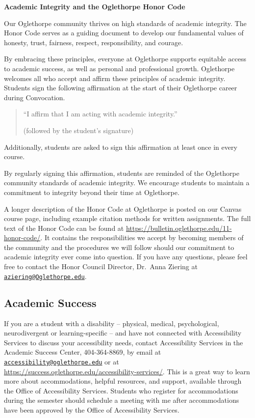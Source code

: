 \documentclass[
]{book}
\begin{document}
\textbf{Academic Integrity and the Oglethorpe Honor Code}

Our Oglethorpe community thrives on high standards of academic integrity. The Honor Code serves as a guiding document to develop our fundamental values of honesty, trust, fairness, respect, responsibility, and courage.

By embracing these principles, everyone at Oglethorpe supports equitable access to academic success, as well as personal and professional growth. Oglethorpe welcomes all who accept and affirm these principles of academic integrity.\\
Students sign the following affirmation at the start of their Oglethorpe career during Convocation.

\begin{quote}
``I affirm that I am acting with academic integrity.''

(followed by the student's signature)
\end{quote}

Additionally, students are asked to sign this affirmation at least once in every course.

By regularly signing this affirmation, students are reminded of the Oglethorpe community standards of academic integrity. We encourage students to maintain a commitment to integrity beyond their time at Oglethorpe.

A longer description of the Honor Code at Oglethorpe is posted on our Canvas course page, including example citation methods for written assignments. The full text of the Honor Code can be found at \url{https://bulletin.oglethorpe.edu/11-honor-code/}. It contains the responsibilities we accept by becoming members of the community and the procedures we will follow should our commitment to academic integrity ever come into question. If you have any questions, please feel free to contact the Honor Council Director, Dr.~Anna Ziering at \href{mailto:aziering@Oglethorpe.edu}{\nolinkurl{aziering@Oglethorpe.edu}}.

\subsection*{Academic Success}\label{academic-success}

If you are a student with a disability -- physical, medical, psychological, neurodivergent or learning-specific -- and have not connected with Accessibility Services to discuss your accessibility needs, contact Accessibility Services in the Academic Success Center, 404-364-8869, by email at \href{mailto:accessibility@oglethorpe.edu}{\nolinkurl{accessibility@oglethorpe.edu}} or at \url{https://success.oglethorpe.edu/accessibility-services/}. This is a great way to learn more about accommodations, helpful resources, and support, available through the Office of Accessibility Services. Students who register for accommodations during the semester should schedule a meeting with me after accommodations have been approved by the Office of Accessibility Services.
\end{document}
